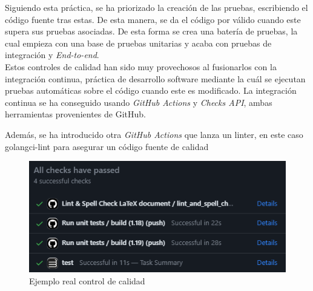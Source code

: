Siguiendo esta práctica, se ha priorizado la creación de las pruebas, escribiendo el código fuente tras estas. De esta manera, se da el código por válido cuando este supera sus pruebas asociadas.
De esta forma se crea una batería de pruebas, la cual empieza con una base de pruebas unitarias y acaba con pruebas de integración y \textit{End-to-end}.\\

Estos controles de calidad han sido muy provechosos al fusionarlos con la integración continua, práctica de desarrollo software mediante la cuál se ejecutan pruebas automáticas sobre el código cuando este es modificado.
La integración continua se ha conseguido usando \textit{GitHub Actions}\cite{actions} y \textit{Checks API}, ambas herramientas provenientes de GitHub.

Además, se ha introducido otra \textit{GitHub Actions} que lanza un linter, en este caso golangci-lint \cite{golangci-lint} para asegurar un código fuente de calidad

\begin{figure}[H]
	\centering	
	\includegraphics[scale=1]{img/actions.png}
	\caption{Ejemplo real control de calidad}
\end{figure}

\newpage